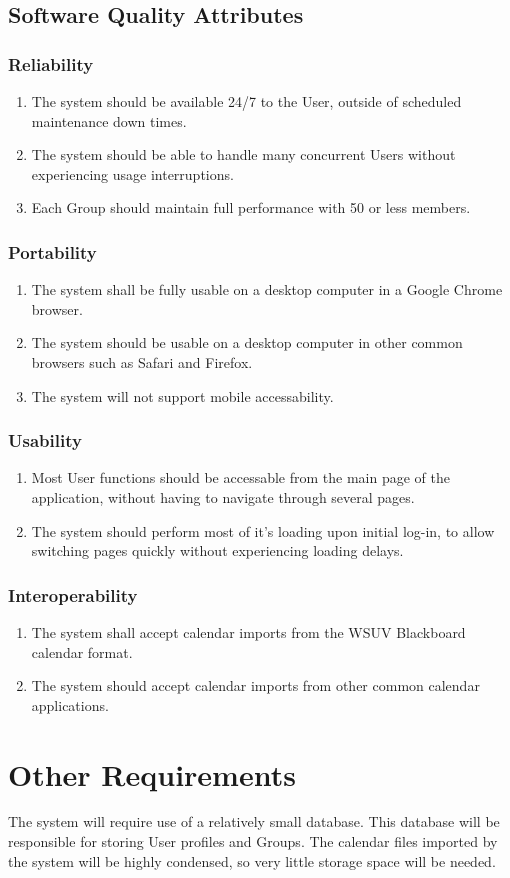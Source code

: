 \documentclass{scrreprt}
\begin{document}
\section{Software Quality Attributes}

\subsection{Reliability}
\begin{enumerate}
\item The system should be available 24/7 to the User, outside of scheduled maintenance
down times.
\item The system should be able to handle many concurrent Users without experiencing
usage interruptions.
\item Each Group should maintain full performance with 50 or less members. 
\end{enumerate}

\subsection{Portability}
\begin{enumerate}
\item The system shall be fully usable on a desktop computer in a Google Chrome
browser.
\item The system should be usable on a desktop computer in other common browsers
such as Safari and Firefox.
\item The system will not support mobile accessability.
\end{enumerate}

\subsection{Usability}
\begin{enumerate}
\item Most User functions should be accessable from the main page of the application,
without having to navigate through several pages.
\item The system should perform most of it's loading upon initial log-in, to allow
switching pages quickly without experiencing loading delays.
\end{enumerate}

\subsection{Interoperability}
\begin{enumerate}
\item The system shall accept calendar imports from the WSUV Blackboard calendar
format.
\item The system should accept calendar imports from other common calendar
applications.
\end{enumerate}

\chapter{Other Requirements}
The system will require use of a relatively small database. This database will be responsible for storing User profiles and Groups. The calendar files imported by the system will be highly condensed, so very little storage space will be needed.
\end{document}
